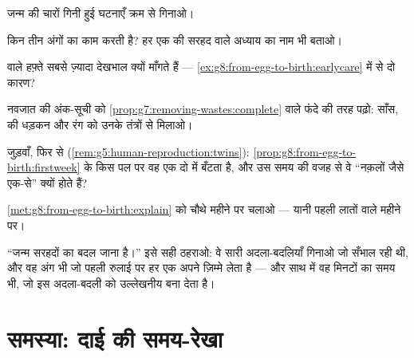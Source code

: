 \begin{exercise}[$\star$]\label{exo:g8:from-egg-to-birth:6}
जन्म की चारों गिनी हुई घटनाएँ क्रम से गिनाओ।
\end{exercise}

\begin{exercise}[$\star\star$]\label{exo:g8:from-egg-to-birth:7}
 किन तीन अंगों का काम करती है? हर एक की सरहद वाले अध्याय का नाम भी
बताओ।
\end{exercise}

\begin{exercise}[$\star\star$]\label{exo:g8:from-egg-to-birth:8}
 वाले हफ़्ते सबसे ज़्यादा देखभाल क्यों माँगते हैं ---
\cref{ex:g8:from-egg-to-birth:earlycare} में से दो कारण?
\end{exercise}

\begin{exercise}[$\star\star$]\label{exo:g8:from-egg-to-birth:9}
नवजात की अंक-सूची को \cref{prop:g7:removing-wastes:complete} वाले
फंदे की तरह पढ़ो: साँस,  की धड़कन और रंग को उनके तंत्रों से मिलाओ।
\end{exercise}

\begin{exercise}[$\star\star$]\label{exo:g8:from-egg-to-birth:10}
जुड़वाँ, फिर से (\cref{rem:g5:human-reproduction:twins}):
\cref{prop:g8:from-egg-to-birth:firstweek} के किस पल पर वह एक 
दो में बँटता है, और उस समय की वजह से वे ``नक़लों जैसे एक-से'' क्यों
होते हैं?
\end{exercise}

\begin{exercise}[$\star\star$]\label{exo:g8:from-egg-to-birth:11}
\cref{met:g8:from-egg-to-birth:explain} को चौथे महीने पर चलाओ ---
यानी पहली लातों वाले महीने पर।
\end{exercise}

\begin{exercise}[$\star\star\star$]\label{exo:g8:from-egg-to-birth:12}
``जन्म सरहदों का बदल जाना है।'' इसे सही ठहराओ: वे सारी अदला-बदलियाँ
गिनाओ जो  सँभाल रही थी, और वह अंग भी जो पहली रुलाई पर हर एक अपने
ज़िम्मे लेता है --- और साथ में वह मिनटों का समय भी, जो इस अदला-बदली को
उल्लेखनीय बना देता है।
\end{exercise}

\section{समस्या: दाई की समय-रेखा}

